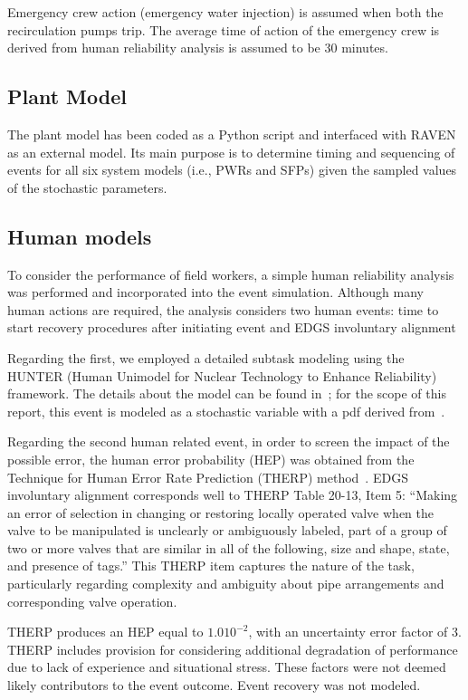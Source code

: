 Emergency crew action (emergency water injection) is assumed when both the recirculation pumps trip. 
The average time of action of the emergency crew is derived from human reliability analysis is assumed 
to be 30 minutes.


\subsection{Plant Model}
\label{sec:plantModel}
The plant model has been coded as a Python script and interfaced with RAVEN as an 
external model. Its main purpose is to determine timing and sequencing of events 
for all six system models (i.e., PWRs and SFPs) given the sampled values of the 
stochastic parameters.

\subsection{Human models}
To consider the performance of field workers, a simple human reliability analysis was 
performed and incorporated into the event simulation. Although many human actions are 
required, the analysis considers two human events: time to start recovery procedures 
after initiating event and EDGS involuntary alignment

Regarding the first, we employed a detailed subtask modeling using the HUNTER (Human Unimodel 
for Nuclear Technology to Enhance Reliability)~\cite{boringHUNTER} framework. The details about 
the model can be found in~\cite{hunterReport2016}; for the scope of this report, this event 
is modeled as a stochastic variable with a pdf derived from~\cite{hunterReport2016}. 

Regarding the second human related event, in order to screen the impact of the possible error, 
the human error probability 
(HEP) was obtained from the Technique for Human Error Rate Prediction (THERP) 
method~\cite{NUREGCR1278}. 
EDGS involuntary alignment corresponds well to THERP Table 20-13, Item 5: ``Making an error 
of selection in changing or restoring locally operated valve when the valve to be manipulated 
is unclearly or ambiguously labeled, part of a group of two or more valves that are similar in 
all of the following, size and shape, state, and presence of tags.'' This THERP item captures 
the nature of the task, particularly regarding complexity and ambiguity about pipe arrangements 
and corresponding valve operation. 

THERP produces an HEP equal to $1.0 10^{-2}$, with an uncertainty 
error factor of 3. THERP includes provision for considering additional degradation of performance 
due to lack of experience and situational stress. These factors were not deemed likely contributors 
to the event outcome. Event recovery was not modeled.

